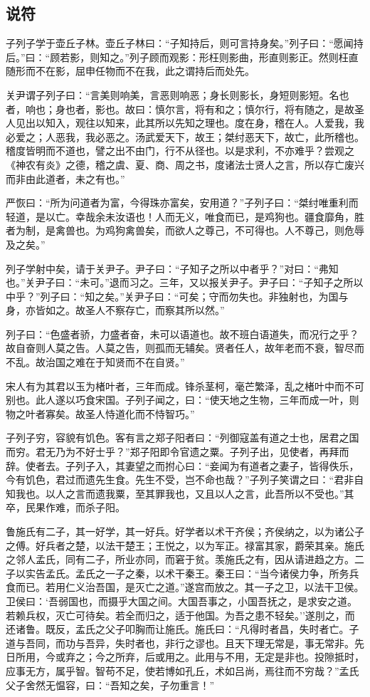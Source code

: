 \documentclass[]{article}
\begin{document}
\hypertarget{header-n133}{%
\subsection{说符}\label{header-n133}}

子列子学于壶丘子林。壶丘子林曰：``子知持后，则可言持身矣。''列子曰：``愿闻持后。''曰：``顾若影，则知之。''列子顾而观影：形枉则影曲，形直则影正。然则枉直随形而不在影，屈申任物而不在我，此之谓持后而处先。

关尹谓子列子曰：``言美则响美，言恶则响恶；身长则影长，身短则影短。名也者，响也；身也者，影也。故曰：慎尔言，将有和之；慎尔行，将有随之，是故圣人见出以知入，观往以知来，此其所以先知之理也。度在身，稽在人。人爱我，我必爱之；人恶我，我必恶之。汤武爱天下，故王；桀纣恶天下，故亡，此所稽也。稽度皆明而不道也，譬之出不由门，行不从径也。以是求利，不亦难乎？尝观之《神农有炎》之德，稽之虞、夏、商、周之书，度诸法士贤人之言，所以存亡废兴而非由此道者，未之有也。''

严恢曰：``所为问道者为富，今得珠亦富矣，安用道？''子列子曰：``桀纣唯重利而轻道，是以亡。幸哉余未汝语也！人而无义，唯食而已，是鸡狗也。疆食靡角，胜者为制，是禽兽也。为鸡狗禽兽矣，而欲人之尊己，不可得也。人不尊己，则危辱及之矣。''

列子学射中矣，请于关尹子。尹子曰：``子知子之所以中者乎？''对曰：``弗知也。''关尹子曰：``未可。''退而习之。三年，又以报关尹子。尹子曰：``子知子之所以中乎？''列子曰：``知之矣。''关尹子曰：``可矣；守而勿失也。非独射也，为国与身，亦皆如之。故圣人不察存亡，而察其所以然。''

列子曰：``色盛者骄，力盛者奋，未可以语道也。故不班白语道失，而况行之乎？故自奋则人莫之告。人莫之告，则孤而无辅矣。贤者任人，故年老而不衰，智尽而不乱。故治国之难在于知贤而不在自贤。''

宋人有为其君以玉为楮叶者，三年而成。锋杀茎柯，毫芒繁泽，乱之楮叶中而不可别也。此人遂以巧食宋国。子列子闻之，曰：``使天地之生物，三年而成一叶，则物之叶者寡矣。故圣人恃道化而不恃智巧。''

子列子穷，容貌有饥色。客有言之郑子阳者曰：``列御寇盖有道之士也，居君之国而穷。君无乃为不好士乎？''郑子阳即令官遗之粟。子列子出，见使者，再拜而辞。使者去。子列子入，其妻望之而拊心曰：``妾闻为有道者之妻子，皆得佚乐，今有饥色，君过而遗先生食。先生不受，岂不命也哉？''子列子笑谓之曰：``君非自知我也。以人之言而遗我粟，至其罪我也，又且以人之言，此吾所以不受也。''其卒，民果作难，而杀子阳。

鲁施氏有二子，其一好学，其一好兵。好学者以术干齐侯；齐侯纳之，以为诸公子之傅。好兵者之楚，以法干楚王；王悦之，以为军正。禄富其家，爵荣其亲。施氏之邻人孟氏，同有二子，所业亦同，而窘于贫。羡施氏之有，因从请进趋之方。二子以实告孟氏。孟氏之一子之秦，以术干秦王。秦王曰：``当今诸侯力争，所务兵食而已。若用仁义治吾国，是灭亡之道。''遂宫而放之。其一子之卫，以法干卫侯。卫侯曰：`吾弱国也，而摄乎大国之间。大国吾事之，小国吾抚之，是求安之道。若赖兵权，灭亡可待矣。若全而归之，适于他国。为吾之患不轻矣。''遂刖之，而还诸鲁。既反，孟氏之父子叩胸而让施氏。施氏曰：``凡得时者昌，失时者亡。子道与吾同，而功与吾异，失时者也，非行之谬也。且天下理无常是，事无常非。先日所用，今或弃之；今之所弃，后或用之。此用与不用，无定是非也。投隙抵时，应事无方，属乎智。智苟不足，使若博如孔丘，术如吕尚，焉往而不穷哉？''孟氏父子舍然无愠容，曰：``吾知之矣，子勿重言！''
\end{document}
